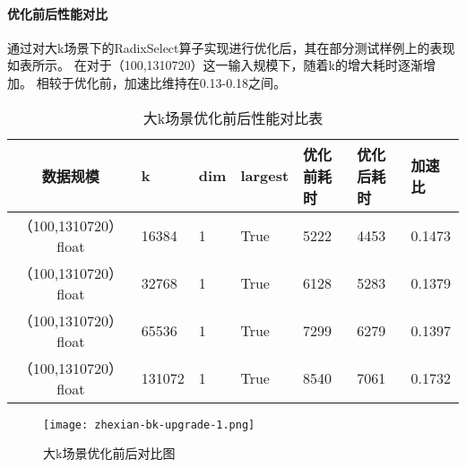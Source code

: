 \paragraph{优化前后性能对比}
通过对大k场景下的RadixSelect算子实现进行优化后，其在部分测试样例上的表现如表所示。
在对于（100,1310720）这一输入规模下，随着k的增大耗时逐渐增加。
相较于优化前，加速比维持在0.13-0.18之间。
\begin{table}
    \centering
    \caption{大k场景优化前后性能对比表}
    \label{tab:bench_bigk_upgrade}
    \begin{tabular}{cllllll}
        \toprule
        数据规模       &k  & dim  & largest & 优化前耗时    & 优化后耗时 &加速比\\
        \midrule
        （100,1310720） float&16384&  1     & True      & 5222 & 4453 & 0.1473\\
        （100,1310720） float&32768&  1     & True      & 6128 & 5283 & 0.1379\\
        （100,1310720） float&65536&  1     & True      & 7299 & 6279 & 0.1397\\
        （100,1310720） float&131072&  1     & True      & 8540 & 7061 & 0.1732\\
        
        
        \bottomrule
    \end{tabular}
    \end{table}
    
    
    \begin{figure}[ht]
        \centering
        \texttt{[image: zhexian-bk-upgrade-1.png]}
        \caption{大k场景优化前后对比图}
        \label{fig:bench_bk_upgrade_zhexian}
    \end{figure}
    




